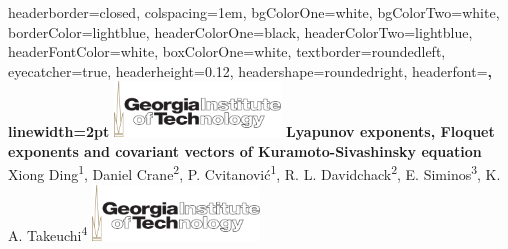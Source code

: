 \documentclass[landscape,paperwidth=42in, paperheight=36in,margin=20mm, fontscale=0.285]{baposter} %
\newcommand{\KSe}{Kuramoto-Siva\-shin\-sky equation}
\begin{document}
\begin{poster}
{
headerborder=closed, %
colspacing=1em, %
bgColorOne=white, %
bgColorTwo=white, %
borderColor=lightblue, %
headerColorOne=black, %
headerColorTwo=lightblue, %
headerFontColor=white, %
boxColorOne=white, %
textborder=roundedleft, %
eyecatcher=true, %
headerheight=0.12\textheight, %
headershape=roundedright, %
headerfont=\Large\bf\textsc, %
linewidth=2pt %
}
%
{\includegraphics[height=4em]{logo.png}} %
{\bf Lyapunov exponents, Floquet exponents and covariant vectors of \KSe \vspace{0.2em}} %
{\large{Xiong Ding\textsuperscript{1}, Daniel Crane\textsuperscript{2},
P. Cvitanovi\'{c}\textsuperscript{1},
R. L. Davidchack\textsuperscript{2},
E. Siminos\textsuperscript{3},
K. A. Takeuchi\textsuperscript{4} }}
{\includegraphics[height=4em]{logo.png}} %



\end{poster}
\end{document}
